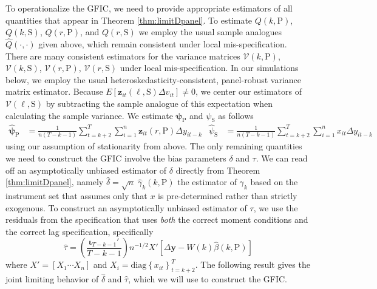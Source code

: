 To operationalize the GFIC, we need to provide appropriate estimators of all quantities that appear in Theorem \ref{thm:limitDpanel}.
To estimate ${Q}(k,\text{P})$, ${Q}(k,\text{S})$, ${Q}(r,\text{P})$, and ${Q}(r,\text{S})$ we employ the usual sample analogues $\widehat{Q}(\cdot,\cdot)$ given above, which remain consistent under local mis-specification.
There are many consistent estimators for the variance matrices $\mathcal{V}(k,\text{P})$, $\mathcal{V}(k,\text{S})$, $\mathcal{V}(r,\text{P})$, $\mathcal{V}(r,\text{S})$ under local mis-specification.
In our simulations below, we employ the usual heteroskedasticity-consistent, panel-robust variance matrix estimator.
Because $E[\mathbf{z}_{it}(\ell,\text{S})\Delta v_{it}]\neq 0$, we center our estimators of $\mathcal{V}(\ell, \text{S})$ by subtracting the sample analogue of this expectation when calculating the sample variance.
We estimate $\boldsymbol{\psi}_{\text{P}}$ and $\psi_{\text{S}}$ as follows
\begin{align*}
  \widehat{\boldsymbol{\psi}}_{\text{P}} &= \frac{1}{n(T - k - 1)}\sum_{t = k+2}^T \sum_{i = 1}^n \mathbf{z}_{it}(r,\text{P}) \Delta y_{it-k} &
  \widehat{\psi}_{\text{S}} &= \frac{1}{n(T - k - 1)}\sum_{t = k+2}^T \sum_{i = 1}^n x_{it} \Delta y_{it-k}
\end{align*}
using our assumption of stationarity from above.
The only remaining quantities we need to construct the GFIC involve the bias parameters $\delta$ and $\tau$. 
We can read off an asymptotically unbiased estimator of $\delta$ directly from Theorem \ref{thm:limitDpanel}, namely $\widehat{\delta} = \sqrt{n}\; \widehat{\gamma}_k(k,\text{P})$ the estimator of $\gamma_k$ based on the instrument set that assumes only that $x$ is pre-determined rather than strictly exogenous.
To construct an asymptotically unbiased estimator of $\tau$, we use the residuals from the specification that uses \emph{both} the correct moment conditions and the correct lag specification, specifically
\begin{equation}
  \label{eq:DpanelTau}
  \widehat{\tau} = \left( \frac{\boldsymbol{\iota}_{T-k-1}'}{T - k - 1} \right) n^{-1/2} X' \left[\Delta \mathbf{y} - W(k)\widehat{\beta}(k,\text{P})  \right]
\end{equation}
where $X' = [X_1 \cdots X_n]$ and $X_i = \mbox{diag}\left\{ x_{it} \right\}_{t = k + 2}^{T}$.
The following result gives the joint limiting behavior of $\widehat{\delta}$ and $\widehat{\tau}$, which we will use to construct the GFIC.

